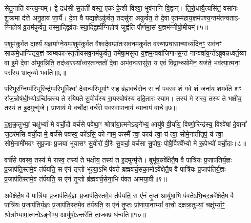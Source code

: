 सेतु॒नाति॑ यन्त्य॒न्यम्। द्वे द्रध॑सी स॒तती॑ वस्त॒ एकः॑ के॒शी विश्वा॒ भुव॑नानि वि॒द्वान्। ति॒रो॒धायै॒त्यसि॑तं॒ वसा॑नः शु॒क्रमा द॑त्ते अनु॒हाय॑ जा॒र्यै। दे॒वा वै यद्य॒ज्ञे\-ऽकु॑र्वत॒ तदसु॑रा अकुर्वत॒ ते दे॒वा ए॒तम्म॑हाय॒ज्ञम॑पश्य॒न्तम॑तन्वता\-ऽ- ग्निहो॒त्रं व्र॒तम॑कुर्वत॒ तस्मा॒द्द्विव्र॑तः स्या॒द्द्विर्\mbox{}ह्य॑ग्निहो॒त्रं जुह्व॑ति पौर्णमा॒सं य॒ज्ञम॑ग्नीषो॒मीयम्᳚॥५॥

प॒शुम॑कुर्वत दा॒र्श्यं य॒ज्ञमा᳚ग्ने॒यम्प॒शुम॑कुर्वत वैश्वदे॒वम्प्रा॑तःसव॒नम॑कुर्वत वरुणप्रघा॒सान्माध्यं॑दिन॒ꣳ॒ सव॑नꣳ साकमे॒धान्पि॑तृय॒ज्ञं त्र्य॑म्बकाꣳस्तृतीयसव॒नम॑कुर्वत॒ तमे॑षा॒मसु॑रा य॒ज्ञम॒न्ववा॑जिगाꣳस॒न्तं नान्ववा॑य॒न्ते᳚\-ऽब्रुवन्नध्वर्त॒व्या वा इ॒मे दे॒वा अ॑भूव॒न्निति॒ तद॑ध्व॒रस्या᳚ध्वर॒त्वन्ततो॑ दे॒वा अभ॑व॒न्परासु॑रा॒ य ए॒वं वि॒द्वान्थ्सोमे॑न॒ यज॑ते॒ भव॑त्या॒त्मना॒ परा᳚स्य॒ भ्रातृ॑व्यो भवति॥६॥

{\anuvakamend[{अप॑श्यन्तो\-ऽग्नीषो॒मीय॑मा॒त्मना॒ परा॒ त्रीणि॑ च॥२॥}]}

प॒रि॒भूर॒ग्निम्प॑रि॒भूरिन्द्र॑म्परि॒भूर्विश्वां᳚ दे॒वान्प॑रि॒भूर्माꣳ स॒ह ब्र॑ह्मवर्च॒सेन॒ स नः॑ पवस्व॒ शं गवे॒ शं जना॑य॒ शमर्व॑ते॒ शꣳ रा॑ज॒न्नोष॑धी॒भ्यो\-ऽच्छि॑न्नस्य ते रयिपते सु॒वीर्य॑स्य रा॒यस्पोष॑स्य ददि॒तारः॑ स्याम। तस्य॑ मे रास्व॒ तस्य॑ ते भक्षीय॒ तस्य॑ त इ॒दमुन्मृ॑जे। प्रा॒णाय॑ मे वर्चो॒दा वर्च॑से पवस्वापा॒नाय॑ व्या॒नाय॑ वा॒चे॥७॥

द॒क्ष॒क्र॒तुभ्यां॒ चक्षु॑र्भ्यां मे वर्चो॒दौ वर्च॑से पवेथा॒ꣳ॒ श्रोत्रा॑या॒त्मने\-ऽङ्गे᳚भ्य॒ आयु॑षे वी॒र्या॑य॒ विष्णो॒रिन्द्र॑स्य॒ विश्वे॑षां दे॒वानां᳚ ज॒ठर॑मसि वर्चो॒दा मे॒ वर्च॑से पवस्व॒ को॑\-ऽसि॒ को नाम॒ कस्मै᳚ त्वा॒ काय॑ त्वा॒ यं त्वा॒ सोमे॒नाती॑तृपं॒ यं त्वा॒ सोमे॒नामी॑मदꣳ सुप्र॒जाः प्र॒जया॑ भूयासꣳ सु॒वीरो॑ वी॒रैः सु॒वर्चा॒ वर्च॑सा सु॒पोषः॒ पोषै॒र्विश्वे᳚भ्यो मे रू॒पेभ्यो॑ वर्चो॒दाः॥८॥

वर्च॑से पवस्व॒ तस्य॑ मे रास्व॒ तस्य॑ ते भक्षीय॒ तस्य॑ त इ॒दमुन्मृ॑जे। बुभू॑ष॒न्नवे᳚क्षेतै॒ष वै पात्रि॑यः प्र॒जाप॑तिर्य॒ज्ञः प्र॒जाप॑ति॒स्तमे॒व त॑र्पयति॒ स ए॑नं तृ॒प्तो भूत्या॒\-ऽभि प॑वते ब्रह्मवर्च॒सका॒मो\-ऽवे᳚क्षेतै॒ष वै पात्रि॑यः प्र॒जाप॑तिर्य॒ज्ञः प्र॒जाप॑तिस्तमे॒व त॑र्पयति॒ स ए॑नं तृ॒प्तो ब्र॑ह्मवर्च॒सेना॒भि प॑वत आमया॒वी॥९॥

अवे᳚क्षेतै॒ष वै पात्रि॑यः प्र॒जाप॑तिर्य॒ज्ञः प्र॒जाप॑ति॒स्तमे॒व त॑र्पयति॒ स ए॑नं तृ॒प्त आयु॑षा॒भि प॑वते\-ऽभि॒चर॒न्नवे᳚क्षेतै॒ष वै पात्रि॑यः प्र॒जाप॑तिर्य॒ज्ञः प्र॒जाप॑ति॒स्तमे॒व त॑र्पयति॒ स ए॑नं तृ॒प्तः प्रा॑णापा॒ना\-भ्यां᳚ वा॒चो द॑क्षक्र॒तुभ्यां॒ चक्षु॑र्भ्या॒ꣳ॒ श्रोत्रा᳚भ्यामा॒त्मनो\-ऽङ्गे᳚भ्य॒ आयु॑षो॒\-ऽन्तरे॑ति ता॒जक्प्र ध॑न्वति॥१०॥

{\anuvakamend[{वा॒चे रू॒पेभ्यो॑ वर्चो॒दा आ॑मया॒वी पञ्च॑चत्वारिꣳशच्च॥३॥}]}

